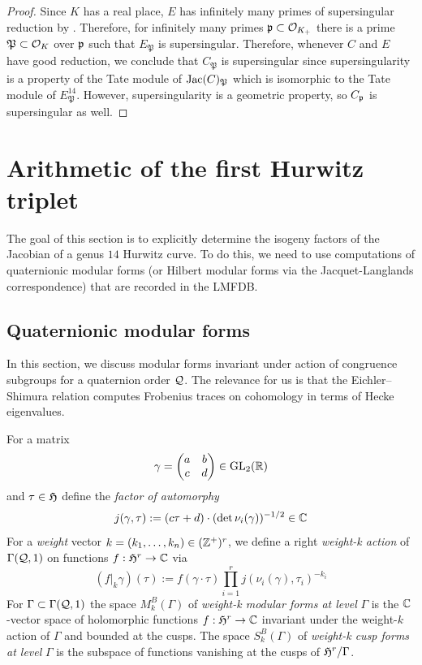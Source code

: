 \documentclass[main.tex]{subfiles}
\begin{document}
\begin{proof}
Since $K$ has a real place, $E$ has infinitely many primes of supersingular reduction by \cite{elkies:supersingular}. Therefore, for infinitely many primes $\mathfrak{p} \subset \mathcal{O}_{K_+}$ there is a prime $\mathfrak{P} \subset \mathcal{O}_{K}$ over $\mathfrak{p}$ such that $E_{\mathfrak{P}}$ is supersingular. Therefore, whenever $C$ and $E$ have good reduction, we conclude that $C_{\mathfrak{P}}$ is supersingular since supersingularity is a property of the Tate module of $\operatorname{\mathrm{Jac}}(C)_{\mathfrak{P}}$ which is isomorphic to the Tate module of $E_{\mathfrak{P}}^{14}$. However, supersingularity is a geometric property, so $C_{\mathfrak{p}}$ is supersingular as well.
\end{proof}


\section{Arithmetic of the first Hurwitz triplet}

The goal of this section is to explicitly determine the isogeny factors of the Jacobian of a genus $14$ Hurwitz curve. To do this, we need to use computations of quaternionic modular forms (or Hilbert modular forms via the Jacquet-Langlands correspondence) that are recorded in the LMFDB.

\subsection{Quaternionic modular forms}

In this section, we discuss modular forms invariant under action of congruence subgroups for a quaternion order $\mathcal{Q}$. The relevance for us is that the Eichler--Shimura relation computes Frobenius traces on \etale cohomology in terms of Hecke eigenvalues.

\begin{defn}
For a matrix
\[ \gamma =
\begin{pmatrix}
a & b
\\
c & d
\end{pmatrix} \in \mathrm{GL}_2(\mathbb{R}) \]
and $\tau \in \mathfrak{H}$ define the \textit{factor of automorphy}
\[ j(\gamma, \tau) := (c \tau + d) \cdot (\det{\nu_i(\gamma)})^{-1/2} \in \mathbb{C} \]
For a \textit{weight} vector $k = (k_1, \dots, k_n) \in (\mathbb{Z}^+)^r$, we define a right \textit{weight-k action} of $\Gamma(\mathcal{Q}, 1)$ on functions $f : \mathfrak{H}^r \to \mathbb{C}$ via
\[ (f|_k \gamma)(\tau) := f(\gamma \cdot \tau) \prod_{i = 1}^r j(\nu_i(\gamma), \tau_i)^{-k_i} \]
For $\Gamma \subset \Gamma(\mathcal{Q}, 1)$ the space $M_k^B(\Gamma)$ of \textit{weight-k modular forms at level} $\Gamma$ is the $\mathbb{C}$-vector space of holomorphic functions $f : \mathfrak{H}^r \to \mathbb{C}$ invariant under the weight-$k$ action of $\Gamma$ and bounded at the cusps. The space $S_k^B(\Gamma)$ of \textit{weight-k cusp forms at level} $\Gamma$ is the subspace of functions vanishing at the cusps of $\mathfrak{H}^r / \Gamma$.
\end{defn}
\end{document}
